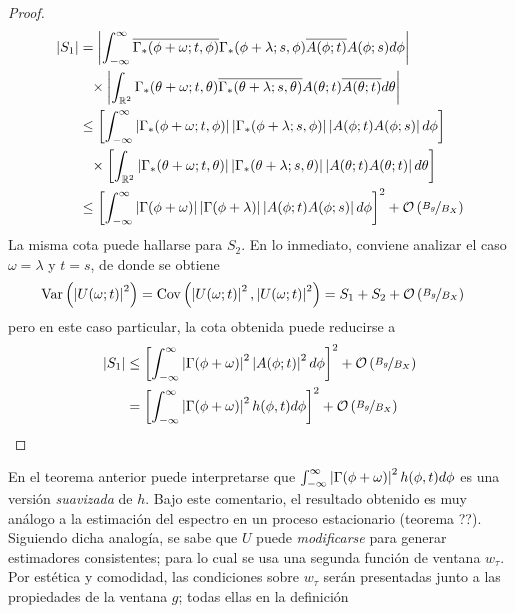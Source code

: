 \begin{proof}
\begin{align*}
\abso{S_1} &=
 \abso{ \intR \overline{\Gamma_*(\phi + \omega; t, \phi)} \Gamma_*(\phi+ \lambda; s, \phi)
 \overline{A(\phi; t)} A(\phi; s) d\phi } \\
 &\pheq \times \abso{ \int_{\R^{2}} \Gamma_*(\theta+ \omega; t, \theta) 
  \overline{\Gamma_*(\theta + \lambda; s, \theta)}  
 A(\theta; t)   \overline{A(\theta; t)} d\theta } \\ 
 &\leq
 \left[ \intR \abso{\Gamma_*(\phi + \omega; t, \phi)} \abso{\Gamma_*(\phi+ \lambda; s, \phi)}
 \abso{A(\phi; t) A(\phi; s)} d\phi \right] \\
 &\pheq \times \left[ \int_{\R^{2}} \abso{\Gamma_*(\theta+ \omega; t, \theta)} 
  \abso{\Gamma_*(\theta + \lambda; s, \theta)}  
 \abso{A(\theta; t) A(\theta; t)} d\theta \right] \\ 
 &\leq
 \left[ \intR \abso{\Gamma(\phi + \omega)} \abso{\Gamma(\phi+ \lambda)}
 \abso{A(\phi; t) A(\phi; s)} d\phi \right]^{2} + \orden{\nicefrac{B_g}{B_X}}
\end{align*}
La misma cota puede hallarse para $S_2$. En lo inmediato, conviene analizar el caso $\omega = \lambda$ y $t = s$, de donde se obtiene
\begin{align*}
\mathrm{Var}\left( \left| U(\omega; t) \right|^{2} \right) &= \mathrm{Cov}\left( \left| U(\omega; t) \right|^{2}, \left| U(\omega; t) \right|^{2} \right) = S_1 + S_2 + \mathcal{O}\left( \nicefrac{B_g}{B_X} \right)
\end{align*}
pero en este caso particular, la cota obtenida puede reducirse a
\begin{align*}
\left| S_1 \right| & \leq
\left[ \int_{-\infty}^{\infty} \left| \Gamma(\phi + \omega) \right|^{2} \left| A(\phi; t) \right|^{2} d\phi \right]^{2} + \mathcal{O}\left( \nicefrac{B_g}{B_X} \right) \\
&= 
\left[ \int_{-\infty}^{\infty} \left| \Gamma(\phi + \omega) \right|^{2} h(\phi, t) d\phi \right]^{2} + \mathcal{O}\left( \nicefrac{B_g}{B_X} \right)
\end{align*}
\end{proof}

En el teorema anterior puede interpretarse que $\int_{-\infty}^{\infty} \left| \Gamma(\phi + \omega) \right|^{2} h(\phi, t) d\phi$ es una versión \textit{suavizada} de $h$.
%
Bajo este comentario, el resultado obtenido es muy análogo a la estimación del espectro en un proceso estacionario (teorema ??).
%
Siguiendo dicha analogía, se sabe que $U$ puede \textit{modificarse} para generar estimadores consistentes; para lo cual se usa una segunda función de ventana $w_\tau$. 
%
Por estética y comodidad, las condiciones sobre $w_\tau$ serán presentadas junto a las propiedades de la ventana $g$; todas ellas en la definición

